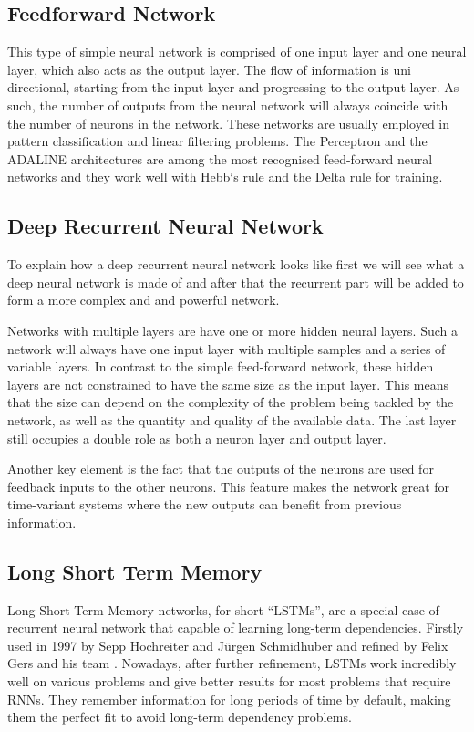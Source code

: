 \subsection{Feedforward Network}

This type of simple neural network is comprised of one input
layer and one neural layer, which also acts as the output layer.
The flow of information is uni directional, starting from the input layer and progressing to the output layer. As such, the number of outputs from the neural network will always coincide with the number of neurons in the network.
 These networks are usually employed in
pattern classification and linear filtering problems. 
The Perceptron and the ADALINE architectures are among the most recognised feed-forward neural networks and they work well with Hebb`s rule and the Delta rule for training.

\subsection{Deep Recurrent Neural Network}
To explain how a deep recurrent neural network looks like first we will see what a deep neural network is made of and after that the recurrent part will be added to form a more complex and and powerful network.

Networks with multiple layers are have one or more hidden neural layers. Such a network will always have one input layer with multiple samples and a series of variable layers.
In contrast to the simple feed-forward network, these hidden layers are not constrained to have the same size as the input layer. This means
that the size can depend on the complexity of the problem being
tackled by the network, as well as the quantity and quality of the available data. The last layer still occupies a double role as both a neuron layer and output layer.

Another key element is the fact that the outputs of the neurons  are used for feedback inputs to the other neurons.
This feature makes the network great for time-variant systems where the new outputs can benefit from previous information.

\subsection{Long Short Term Memory}
Long Short Term Memory networks, for short “LSTMs”, are a special case of recurrent neural network that  capable of learning long-term dependencies.
Firstly used in 1997 by Sepp Hochreiter and Jürgen Schmidhuber \cite{Father} and refined by Felix Gers and his team \cite{Gers99}.
Nowadays, after further refinement,
LSTMs work incredibly well on various problems and give better results for most problems that require RNNs.
They remember information for long periods of time by default, making them the perfect fit to avoid long-term dependency problems. 

